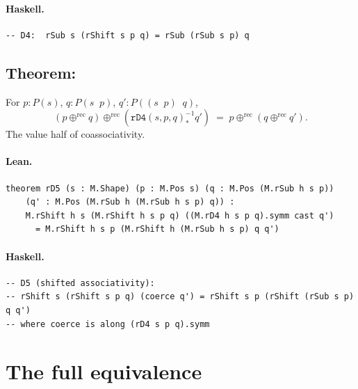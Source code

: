 \documentclass[11pt,a4paper]{article}
\begin{document}
\paragraph{Haskell.}
\begin{lstlisting}[style=haskell]
-- D4:  rSub s (rShift s p q) = rSub (rSub s p) q
\end{lstlisting}


\subsection{Theorem: }

\begin{thm}
For $p : P(s)$, $q : P(s \mathop{\downarrow^\mathrm{rec}} p)$,
$q' : P((s \mathop{\downarrow^\mathrm{rec}} p) \mathop{\downarrow^\mathrm{rec}} q)$,
\[
  (p \oplus^\mathrm{rec} q) \oplus^\mathrm{rec} (\mathtt{rD4}(s,p,q)^{-1}_* q')
  \;=\;
  p \oplus^\mathrm{rec} (q \oplus^\mathrm{rec} q').
\]
The value half of coassociativity.
\end{thm}

\paragraph{Lean.}
\begin{lstlisting}[style=lean]
theorem rD5 (s : M.Shape) (p : M.Pos s) (q : M.Pos (M.rSub h s p))
    (q' : M.Pos (M.rSub h (M.rSub h s p) q)) :
    M.rShift h s (M.rShift h s p q) ((M.rD4 h s p q).symm cast q')
      = M.rShift h s p (M.rShift h (M.rSub h s p) q q')
\end{lstlisting}

\paragraph{Haskell.}
\begin{lstlisting}[style=haskell]
-- D5 (shifted associativity):
-- rShift s (rShift s p q) (coerce q') = rShift s p (rShift (rSub s p) q q')
-- where coerce is along (rD4 s p q).symm
\end{lstlisting}


\section{The full equivalence}
\end{document}
